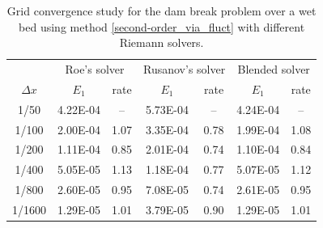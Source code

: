 \documentclass[preprint, 11pt]{article}
\begin{document}
\begin{table}[!ht]\scriptsize
  \begin{center}
    \begin{tabular}{||c||c|c||c|c||c|c||} \hline
      & \multicolumn{2}{c||}{Roe's solver}
      &\multicolumn{2}{c||}{Rusanov's solver}
      &\multicolumn{2}{c||}{Blended solver} \\ \cline{2-7}
      $\Delta x$ & $E_1$ & rate & $E_1$ & rate & $E_1$ & rate \\ \hline
      1/50   & 4.22E-04 &  --  & 5.73E-04 &  --  & 4.24E-04 &  --  \\ 
      1/100  & 2.00E-04 & 1.07 & 3.35E-04 & 0.78 & 1.99E-04 & 1.08 \\
      1/200  & 1.11E-04 & 0.85 & 2.01E-04 & 0.74 & 1.10E-04 & 0.84 \\
      1/400  & 5.05E-05 & 1.13 & 1.18E-04 & 0.77 & 5.07E-05 & 1.12 \\
      1/800  & 2.60E-05 & 0.95 & 7.08E-05 & 0.74 & 2.61E-05 & 0.95 \\
      1/1600 & 1.29E-05 & 1.01 & 3.79E-05 & 0.90 & 1.29E-05 & 1.01 \\ \hline
    \end{tabular}
    \caption{Grid convergence study for the dam break problem over a wet bed
      using method \eqref{second-order_via_fluct} with different Riemann solvers.\label{table:rp_wet_bed}}
  \end{center}
\end{table}
\end{document}
